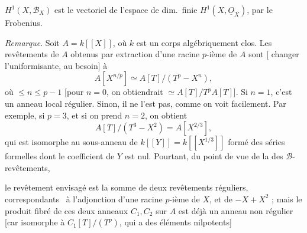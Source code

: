 \documentclass[11pt,a4paper]{article}
\begin{document}

$H^1(X, \mathcal{B}_X)$ est le  vectoriel de
l'espace de dim.\ finie $H^1(X, \underline{O}_X)$,  par le
Frobenius.

\emph{Remarque}. Soit $A = k[[X]]$, où $k$ est un corps algébriquement clos.
Les revêtements \struck{\ill{}} \ill{}  de $A$ obtenus par extraction d'une racine $p$-ième
de $A$ sont \ill{}  [
changer l'uniformisante, au besoin] à
\[
A[X^{n/p}] \simeq A[T]/(T^p - X^n),
\]
où ${} \leq n \leq p-1$ \struck{\ill{}} [pour $n = 0$, on
obtiendrait $\simeq A[T]/T^pA[T]$]. Si $n = 1$, c'est un anneau local
régulier. Sinon, il ne l'est pas, comme on voit facilement. Par exemple, si
$p = 3$,  et si on prend $n = 2$, on obtient
\[
A[T]/(T^3 - X^2) = A[X^{2/3}],
\]
qui est isomorphe au sous-anneau de \struck{\ill{}}
$k[[Y]] = k[[X^{1/3}]]$ formé des séries formelles dont le coefficient de
$Y$ est nul. Pourtant, du point de vue de
la  des
$\mathcal{B}$- revêtements,


le revêtement envisagé est la somme de deux revêtements réguliers,
correspondants \ à l'adjonction d'une racine $p$-ième de $X$, et de
$-X + X^2$ ; mais le produit fibré de ces deux anneaux
$C_1, C_2$ sur $A$ est déjà un anneau non régulier [car isomorphe à
$C_1[T]/(T^p)$, qui a des éléments nilpotents]
\end{document}
